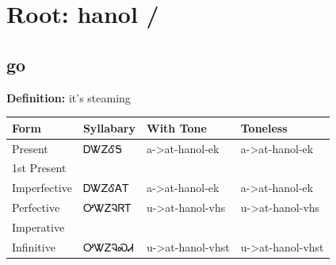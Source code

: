 \documentclass{article}%
\begin{document}
%
\normalsize%
\section*{Root: hanol / }%
\subsection*{go}%
\textbf{Definition: }%
it’s steaming%
\\[0.5em]%
\begin{tabular}{|l|l|l|l|}%
\hline%
\textbf{Form}&\textbf{Syllabary}&\textbf{With Tone}&\textbf{Toneless}\\%
\hline%
Present&ᎠᏔᏃᎴᎦ&a{-}>at{-}hanol{-}ek&a{-}>at{-}hanol{-}ek\\%
1st Present&&&\\%
Imperfective&ᎠᏔᏃᎴᎪᎢ&a{-}>at{-}hanol{-}ek&a{-}>at{-}hanol{-}ek\\%
Perfective&ᎤᏔᏃᎸᏒᎢ&u{-}>at{-}hanol{-}vhs&u{-}>at{-}hanol{-}vhs\\%
Imperative&&&\\%
Infinitive&ᎤᏔᏃᎸᏍᏗ&u{-}>at{-}hanol{-}vhst&u{-}>at{-}hanol{-}vhst\\%
\hline%
\end{tabular}%
\\[1em]%
\end{document}

